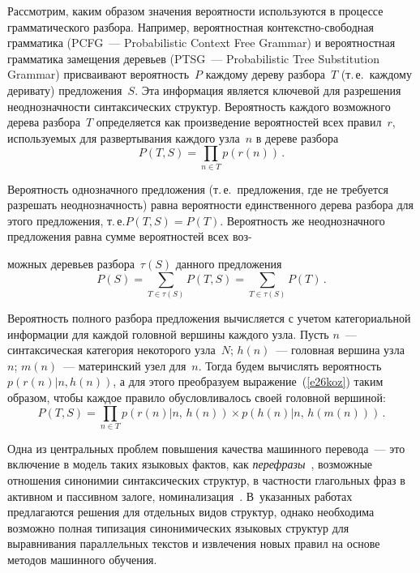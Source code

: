 \begin{multicols}{2}
     Рассмотрим, каким образом значения ве\-ро\-ят\-ности используются в 
процессе грамматического разбора. Например, вероятностная 
     контекст\-но-сво\-бод\-ная грамматика (PCFG~--- Probabilistic Context Free 
Grammar) и вероятностная грамматика замещения деревьев (PTSG~--- 
Probabilistic Tree Substitution Grammar) присваивают вероятность~$P$ 
каж\-дому дереву разбора~$T$ (т.\,е.\ каждому деривату) предложения~$S$. 
Эта информация является ключевой для разрешения неоднозначности 
синтаксических структур. Вероятность каждого возможного дерева 
разбора~$T$ определяется как произведение вероятностей всех правил~$r$, 
используемых для развертывания каждого узла~$n$ в дереве разбора
     \begin{equation}
     P(T,S) =\prod\limits_{n\in T} p(r(n))\,.
     \label{e26koz}
     \end{equation}
     
     Вероятность однозначного предложения (т.\,е.\ предложения, где не 
требуется разрешать неоднозначность) равна вероятности единственного 
дерева разбора для этого предложения, т.\,е.\linebreak $P(T,S) = P(T)$. Вероятность же 
неоднозначного предложения равна сумме вероятностей всех воз-\linebreak\vspace*{-12pt}
\columnbreak

\noindent
можных 
деревьев разбора~$\tau(S)$ данного предло\-жения
     \begin{equation*}
     P(S) =\sum\limits_{T\in\tau(S)} P(T,S)=\sum\limits_{T\in\tau(S)}P(T)\,.
     \end{equation*}
     
     Вероятность полного разбора предложения вычисляется с учетом 
категориальной информации для каждой головной вершины каждого узла. 
Пусть $n$~--- синтаксическая категория некоторого узла~$N$; $h(n)$~--- 
головная вершина узла~$n$; $m(n)$~--- материнский узел для~$n$. Тогда 
будем вычислять вероятность $p(r(n)\vert n, h(n))$, а для этого преобразуем 
выражение~(\ref{e26koz}) таким образом, чтобы каждое правило 
обусловливалось своей головной вершиной:
     \begin{equation*}
     P(T,S) =\prod\limits_{n\in T} p(r(n)\vert n,\,h(n))\times p(h(n)\vert 
n,\,h(m(n)))\,.
     \end{equation*}
     
     Одна из центральных проблем повышения качества машинного 
перевода~--- это включение в модель таких языковых фактов, как 
\textit{перефразы}~\cite{26koz}, возможные отношения синонимии 
синтаксических структур, в частности глагольных фраз в активном и 
пассивном залоге, номинализация~\cite{27koz}. В~указанных работах 
предлагаются решения для отдельных видов структур, однако необходима 
возможно полная типизация синонимических языковых структур для 
выравнивания параллельных текстов и извлечения новых правил на основе 
методов машинного обучения.
     

\end{multicols}
